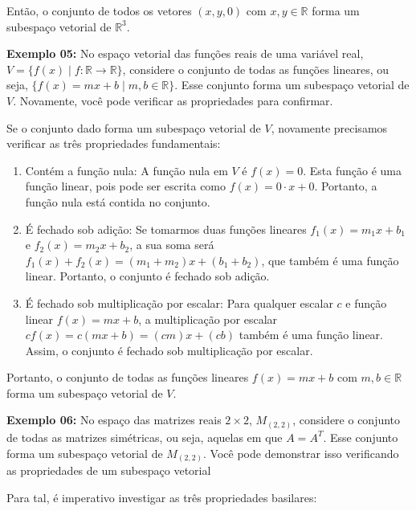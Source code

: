 Então, o conjunto de todos os vetores $(x, y, 0)$ com $x, y \in \mathbb{R}$ forma um subespaço vetorial de $\mathbb{R}^3$.

\noindent\textbf{Exemplo 05:} No espaço vetorial das funções reais de uma variável real, $V = \{f(x) \mid f: \mathbb{R} \rightarrow \mathbb{R}\}$, considere o conjunto de todas as funções lineares, ou seja, $\{f(x) = mx + b \mid m, b \in \mathbb{R}\}$. Esse conjunto forma um subespaço vetorial de $V$. Novamente, você pode verificar as propriedades para confirmar.

Se o conjunto dado forma um subespaço vetorial de $V$, novamente precisamos verificar as três propriedades fundamentais:

\begin{enumerate}
    \item Contém a função nula: A função nula em $V$ é $f(x) = 0$. Esta função é uma função linear, pois pode ser escrita como $f(x) = 0 \cdot x + 0$. Portanto, a função nula está contida no conjunto.
    
    \item É fechado sob adição: Se tomarmos duas funções lineares $f_1(x) = m_1x + b_1$ e $f_2(x) = m_2x + b_2$, a sua soma será $f_1(x) + f_2(x) = (m_1 + m_2)x + (b_1 + b_2)$, que também é uma função linear. Portanto, o conjunto é fechado sob adição.
    
    \item É fechado sob multiplicação por escalar: Para qualquer escalar $c$ e função linear $f(x) = mx + b$, a multiplicação por escalar $cf(x) = c(mx + b) = (cm)x + (cb)$ também é uma função linear. Assim, o conjunto é fechado sob multiplicação por escalar.
\end{enumerate}

Portanto, o conjunto de todas as funções lineares $f(x) = mx + b$ com $m, b \in \mathbb{R}$ forma um subespaço vetorial de $V$.

\noindent\textbf{Exemplo 06:} No espaço das matrizes reais $2 \times 2$, $M_{(2,2)}$, considere o conjunto de todas as matrizes simétricas, ou seja, aquelas em que $A = A^T$. Esse conjunto forma um subespaço vetorial de $M_{(2,2)}$. Você pode demonstrar isso verificando as propriedades de um subespaço vetorial

Para tal, é imperativo investigar as três propriedades basilares:

